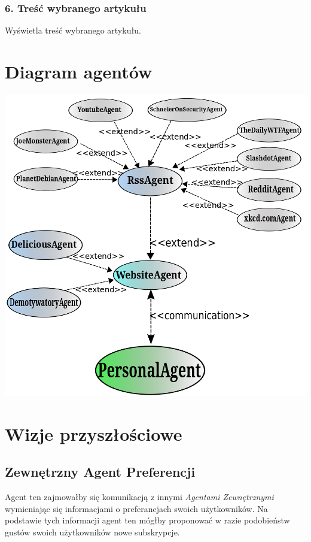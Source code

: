 \documentclass[a4paper,11pt]{report}
\begin{document}
\subsubsection*{6. Treść wybranego artykułu}
Wyświetla treść wybranego artykułu.

\section{Diagram agentów}

\begin{center}
 \includegraphics[scale=0.45]{./diagrams/agent_case1.png}
\end{center}

\newpage
\section{Wizje przyszłościowe}


\subsection{Zewnętrzny Agent Preferencji}
Agent ten zajmowałby się komunikacją z innymi \textit{Agentami Zewnętrznymi}
wymieniając się informacjami o preferancjach swoich użytkowników. Na podstawie
tych informacji agent ten mógłby proponować w razie podobieństw gustów swoich
użytkowników nowe subskrypcje. 
\end{document}
